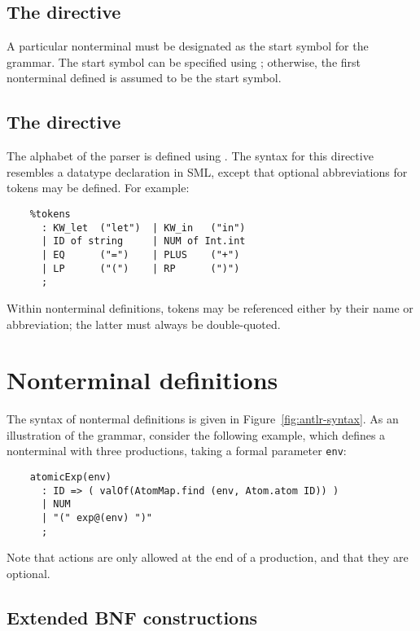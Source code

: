 \subsection{The  directive}\label{sec:start}

A particular nonterminal must be designated as the start symbol for the grammar.  The start symbol can be specified using ; otherwise, the first nonterminal defined is assumed to be the start symbol.

\subsection{The  directive}

The alphabet of the parser is defined using .  The syntax for this directive resembles a datatype declaration in SML, except that optional abbreviations for tokens may be defined.  For example:
\begin{verbatim}
    %tokens
      : KW_let  ("let")  | KW_in   ("in")
      | ID of string     | NUM of Int.int
      | EQ      ("=")    | PLUS    ("+")
      | LP      ("(")    | RP      (")")
      ;
\end{verbatim}
Within nonterminal definitions, tokens may be referenced either by their name or abbreviation; the latter must always be double-quoted.

\section{Nonterminal definitions}\label{sec:antlr-nt}

The syntax of nontermal definitions is given in Figure~\ref{fig:antlr-syntax}.  As an illustration of the grammar, consider the following example, which defines a nonterminal with three productions, taking a formal parameter {\tt env}:
\begin{verbatim}
    atomicExp(env)
      : ID => ( valOf(AtomMap.find (env, Atom.atom ID)) )
      | NUM
      | "(" exp@(env) ")"
      ;
\end{verbatim}
Note that actions are only allowed at the end of a production, and that they are optional.

\subsection{Extended BNF constructions}

